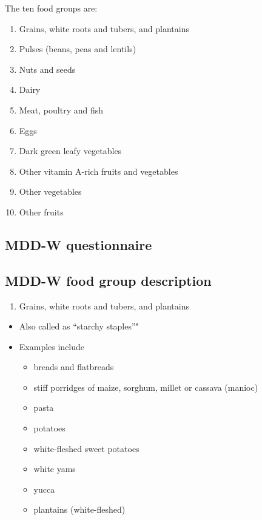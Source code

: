 \documentclass[12pt,]{book}
\providecommand{\tightlist}{%
  \setlength{\itemsep}{0pt}\setlength{\parskip}{0pt}}
\theoremstyle{definition}
\theoremstyle{definition}
\theoremstyle{definition}
\theoremstyle{remark}
\begin{document}
The ten food groups are:

\begin{enumerate}
\def\labelenumi{\arabic{enumi}.}
\tightlist
\item
  Grains, white roots and tubers, and plantains
\item
  Pulses (beans, peas and lentils)
\item
  Nuts and seeds
\item
  Dairy
\item
  Meat, poultry and fish
\item
  Eggs
\item
  Dark green leafy vegetables
\item
  Other vitamin A-rich fruits and vegetables
\item
  Other vegetables
\item
  Other fruits
\end{enumerate}

\hypertarget{mdd-w-questionnaire}{%
\subsection{MDD-W questionnaire}\label{mdd-w-questionnaire}}

\hypertarget{mdd-w-food-group-description}{%
\subsection{MDD-W food group
description}\label{mdd-w-food-group-description}}

\begin{enumerate}
\def\labelenumi{\arabic{enumi}.}
\tightlist
\item
  Grains, white roots and tubers, and plantains
\end{enumerate}

\begin{itemize}
\tightlist
\item
  Also called as ``starchy staples''"
\item
  Examples include

  \begin{itemize}
  \tightlist
  \item
    breads and flatbreads
  \item
    stiff porridges of maize, sorghum, millet or cassava (manioc)
  \item
    pasta
  \item
    potatoes
  \item
    white-fleshed sweet potatoes
  \item
    white yams
  \item
    yucca
  \item
    plantains (white-fleshed)
  \end{itemize}
\end{itemize}
\end{document}
